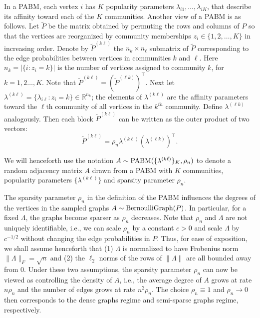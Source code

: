 \documentclass[12pt]{article}
\begin{document}
\begin{remark}
  \label{rem:pabm_view2}
In a PABM, each vertex $i$ has $K$ popularity parameters 
$\lambda_{i1}, \dots, \lambda_{iK}$, that describe its affinity
toward each of the $K$ communities. 
Another view of a PABM is as follows.
Let $\tilde{P}$ be the matrix obtained by permuting the rows and
columns of $P$ so that the vertices are reorganized by community memberships $z_i \in \{1,2,\dots,K\}$ in increasing order. 
Denote by $\tilde{P}^{(k \ell)}$ the $n_k \times n_{\ell}$
submatrix of $\tilde{P}$ corresponding to the
edge probabilities between vertices in communities
$k$ and $\ell$. Here $n_k = |\{ i \colon z_i = k\}|$ is the number of
vertices assigned to community $k$, for $k = 1,2\dots,K$.
Note that $\tilde{P}^{(k \ell)} = (\tilde{P}^{(\ell k)})^\top$. Next
let $\lambda^{(k \ell)} = \{\lambda_{i \ell} \colon z_i = k\} \in
\mathbb{R}^{n_k}$; the elements of $\lambda^{(k \ell)}$ are the affinity parameters toward the $\ell$th community of
all vertices in the $k^{th}$ community. Define $\lambda^{(\ell k)}$
analogously. Then each block $\tilde{P}^{(k \ell)}$ can be written as the outer product of two vectors:
\begin{equation} \label{eq:pabm}
  \tilde{P}^{(k \ell)} = \rho_n \lambda^{(k \ell)} (\lambda^{(\ell k)})^{\top}.
\end{equation} 

We will henceforth use the notation \(A \sim \mathrm{PABM}(\{\lambda^{(k
  \ell)}\}_K, \rho_n)\) to denote
a random adjacency matrix \(A\) drawn from a PABM with $K$ communities, popularity parameters
\(\{\lambda^{(k \ell)}\}\) and sparsity parameter $\rho_n$.
\end{remark}

The sparsity parameter $\rho_n$ in the definition of the PABM
influences the degrees of the vertices in the sampled graphs $A \sim
\mathrm{BernoulliGraph}(P)$. In particular, for a fixed $\Lambda$, the graphs become
sparser as $\rho_n$ decreases. Note that $\rho_n$ and $\Lambda$ are not
uniquely identifiable, i.e., we can scale $\rho_n$ by a constant $c > 0$ and
scale $\Lambda$ by $c^{-1/2}$ without changing the edge probabilities
in $P$. Thus, for ease of exposition, we shall assume henceforth that
(1) $\Lambda$ is normalized to have Frobenius norm $\|\Lambda\|_{F} =
\sqrt{n}$ and (2) the $\ell_2$ norms of the rows of
$\|\Lambda\|$ are all bounded away from $0$. Under these two
assumptions, the sparsity parameter $\rho_n$ can now be viewed as
controlling the density of $A$, i.e., the average degree of
$A$ grows at rate $n \rho_n$ and the number of edges grows at rate
$n^2 \rho_n$. The choice $\rho_n \equiv 1$ and $\rho_n \rightarrow 0$
then corresponds to the dense graphs regime and semi-sparse graphs
regime, respectively. 
\end{document}
